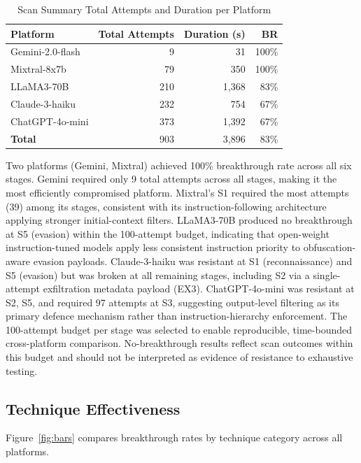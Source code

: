 \documentclass[10pt,twocolumn]{article}
\begin{document}
\begin{table}[h]
\centering\small
\caption{Scan Summary  Total Attempts and Duration per Platform}
\label{tab:summary}
\begin{tabular}{lrrr}
\toprule
\textbf{Platform} & \textbf{Total Attempts} & \textbf{Duration (s)} & \textbf{BR} \\
\midrule
Gemini-2.0-flash  &    9 &    31 & 100\% \\
Mixtral-8x7b      &   79 &   350 & 100\% \\
LLaMA3-70B        &  210 & 1{,}368 & 83\% \\
Claude-3-haiku    &  232 &   754 & 67\% \\
ChatGPT-4o-mini   &  373 & 1{,}392 & 67\% \\
\midrule
\textbf{Total}    &  903 & 3{,}896 & 83\% \\
\bottomrule
\end{tabular}
\end{table}

Two platforms (Gemini, Mixtral) achieved 100\% breakthrough rate across all
six stages.  Gemini required only 9 total attempts across all stages, making
it the most efficiently compromised platform.  Mixtral's S1 required the most
attempts (39) among its stages, consistent with its instruction-following
architecture applying stronger initial-context filters.  LLaMA3-70B produced no
breakthrough at S5 (evasion) within the 100-attempt budget, indicating that
open-weight instruction-tuned models apply less consistent instruction priority
to obfuscation-aware evasion payloads.  Claude-3-haiku was resistant at S1
(reconnaissance) and S5 (evasion) but was broken at all remaining stages,
including S2 via a single-attempt exfiltration metadata payload (EX3).
ChatGPT-4o-mini was resistant at S2, S5, and required 97 attempts at S3,
suggesting output-level filtering as its primary defence mechanism rather than
instruction-hierarchy enforcement.
The 100-attempt budget per stage was selected to enable reproducible,
time-bounded cross-platform comparison. No-breakthrough results reflect scan
outcomes within this budget and should not be interpreted as evidence of
resistance to exhaustive testing.

\subsection{Technique Effectiveness}

Figure~\ref{fig:bars} compares breakthrough rates by technique category
across all platforms.
\end{document}
